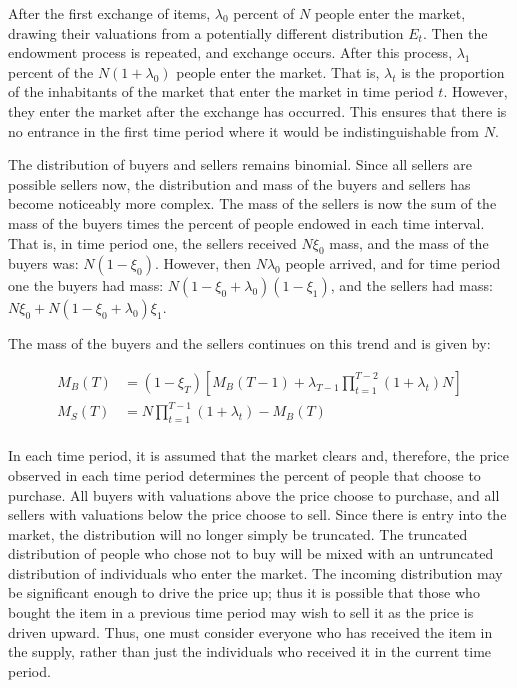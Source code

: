 \documentclass[12pt, letterpaper]{paper}
\begin{document}
After the first exchange of items, $\lambda$$_{\text{0}}$
percent of $N$ people enter the market, drawing their valuations from a
potentially different distribution $E_t$. Then the endowment process is
repeated, and exchange occurs. After this process, $\lambda$$_{\text{1}}$ percent of the
$N(1+\lambda_0)$ people enter the market. That is, $\lambda_t$ is the proportion of the
inhabitants of the market that enter the market in time period
$t$. However, they enter the market after the exchange has
occurred. This ensures that there is no entrance in the first time
period where it would be indistinguishable from $N$.

The distribution of buyers and sellers remains binomial. Since all
sellers are possible sellers now, the distribution and mass of the
buyers and sellers has become noticeably more complex. The mass of the
sellers is now the sum of the mass of the buyers times the percent of
people endowed in each time interval. That is, in time period one, the
sellers received $N \xi_0$ mass, and the mass of the buyers was:
$N(1-\xi_0)$. However, then $N\lambda_0$ people arrived, and for time period one
the buyers had mass: $N( 1 -\xi_0 + \lambda_0)(1-\xi_1)$, and the sellers had mass:
$N \xi_0 + N(1-\xi_0 + \lambda_0)\xi_1$.

The mass of the buyers and the sellers continues on this trend and is
given by:

\begin{align*}
M_B(T) &= ( 1 - \xi_T ) \left [ M_B(T-1) + \lambda_{T-1} \prod_{t=1}^{T-2}( 1 + \lambda_t )N \right ] \\
M_S(T) &= N \prod_{t=1}^{T-1} ( 1 + \lambda_t ) - M_B (T)\\
\end{align*}

In each time period, it is assumed that the market clears and,
therefore, the price observed in each time period determines the
percent of people that choose to purchase. All buyers with valuations
above the price choose to purchase, and all sellers with valuations
below the price choose to sell. Since there is entry into the
market, the distribution will no longer simply be truncated. The
truncated distribution of people who chose not to buy will be mixed
with an untruncated distribution of individuals who enter the
market. The incoming distribution may be significant enough to
drive the price up; thus it is possible that those who bought the item in a
previous time period may wish to sell it as the price is driven
upward. Thus, one must consider everyone who has received the
item in the supply, rather than just the individuals who received it
in the current time period.
\end{document}
